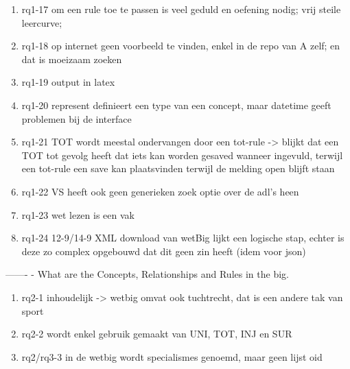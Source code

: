 \begin{enumerate}
    \item rq1-17 om een rule toe te passen is veel geduld en oefening nodig; vrij steile leercurve; 
    \item rq1-18 op internet geen voorbeeld te vinden, enkel in de repo van A zelf; en dat is moeizaam zoeken
    \item rq1-19 output in latex 
    \item rq1-20 represent definieert een type van een concept, maar datetime geeft problemen bij de interface
    \item rq1-21 TOT wordt meestal ondervangen door een tot-rule -> blijkt dat een TOT tot gevolg heeft dat iets kan worden gesaved wanneer ingevuld, terwijl een tot-rule een save kan plaatsvinden terwijl de melding open blijft staan
    \item rq1-22 VS heeft ook geen generieken zoek optie over de adl's heen
    \item rq1-23 wet lezen is een vak 
    \item rq1-24 12-9/14-9 XML download van wetBig lijkt een logische stap, echter is deze zo complex opgebouwd dat dit geen zin heeft (idem voor json)
\end{enumerate}



-------
\newline
[RQ2]- What are the Concepts, Relationships and Rules in the \acrshort{big}.
\begin{enumerate}
    \item rq2-1 inhoudelijk -> wetbig omvat ook tuchtrecht, dat is een andere tak van sport
    \item rq2-2 wordt enkel gebruik gemaakt van UNI, TOT, INJ en SUR
    \item rq2/rq3-3 in de wetbig wordt specialismes genoemd, maar geen lijst oid
\end{enumerate}

